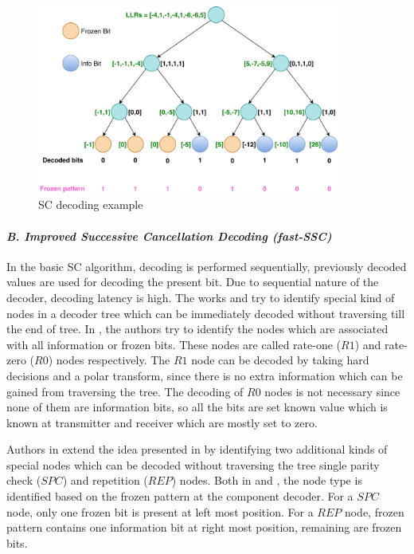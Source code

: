 \begin{figure}[h]
	\centering
	\includegraphics[width=0.9\textwidth]{./figures/SCDecodingExample1.pdf}
	\caption{SC decoding example}
	\label{fig:scDecodingEg}
\end{figure}


\paragraph{\emph{B. Improved Successive Cancellation Decoding (fast-SSC)}\newline}  \label{fastSSC} 
In the basic SC algorithm, decoding is performed sequentially, previously decoded values are used for decoding the present bit. Due to sequential nature of the decoder, decoding latency is high. The works \cite{SSC} and \cite{fastSSC} try to identify special kind of nodes in a decoder tree which can be immediately decoded without traversing till the end of tree. In \cite{SSC}, the authors try to identify the nodes which are associated with all information or frozen bits. These nodes are called rate-one ($R1$) and rate-zero ($R0$) nodes respectively. The $R1$ node can be decoded by taking hard decisions and a polar transform, since there is no extra information which can be gained from traversing the tree. The decoding of $R0$ nodes is not necessary since none of them are information bits, so all the bits are set known value which is known at transmitter and receiver which are mostly set to zero. \par Authors in \cite{fastSSC} extend the idea presented in \cite{SSC} by identifying two additional kinds of special nodes which can be decoded without traversing the tree single parity check ($SPC$) and repetition ($REP$) nodes. Both in \cite{SSC} and \cite{fastSSC}, the node type is identified based on the frozen pattern at the component decoder. For a $SPC$ node, only one frozen bit is present at left most position. For a $REP$ node, frozen pattern contains one information bit at right most position, remaining are frozen bits.

